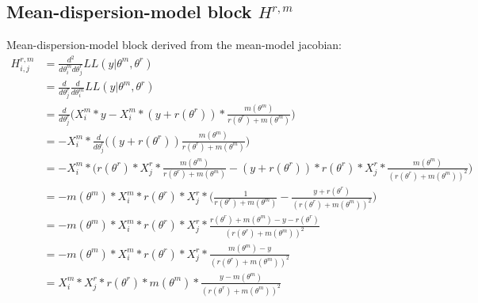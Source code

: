 \documentclass[bibliography=totoc,10pt]{scrartcl}
\begin{document}
\subsection{Mean-dispersion-model block $H^{r,m}$}
Mean-dispersion-model block derived from the mean-model jacobian:
\begin{equation}
\begin{split}
H^{r,m}_{i,j} &= \frac{d^2}{d \theta^m_i d \theta^r_j} LL(y|\theta^m, \theta^r) \\
&= \frac{d}{d \theta^r_j} \frac{d}{d \theta^m_i} LL(y|\theta^m, \theta^r) \\
&= \frac{d}{d \theta^r_j} \bigg( X^m_{i}*y - X^m_{i}*(y+r(\theta^r))*\frac{m(\theta^m)}{r(\theta^r)+m(\theta^m)} \bigg) \\
&= -X^m_{i}* \frac{d}{d \theta^r_j} \bigg(  (y+r(\theta^r)) \frac{m(\theta^m)}{r(\theta^r)+m(\theta^m)} \bigg) \\
&= -X^m_{i}* \bigg(  r(\theta^r) * X^r_{j} * \frac{m(\theta^m)}{r(\theta^r)+m(\theta^m)} - (y+r(\theta^r)) *  r(\theta^r) * X^r_{j}  * \frac{m(\theta^m)}{(r(\theta^r)+m(\theta^m))^2} \bigg) \\
&= - m(\theta^m) * X^m_{i}   * r(\theta^r) * X^r_{j}  * \bigg( \frac{1}{r(\theta^r)+m(\theta^m)} - \frac{y+r(\theta^r)}{(r(\theta^r)+m(\theta^m))^2} \bigg) \\
&= - m(\theta^m) * X^m_{i}   * r(\theta^r) * X^r_{j}  *  \frac{r(\theta^r)+m(\theta^m)-y-r(\theta^r)}{(r(\theta^r)+m(\theta^m))^2} \\
&= - m(\theta^m) * X^m_{i}   * r(\theta^r) * X^r_{j}  *  \frac{m(\theta^m)-y}{(r(\theta^r)+m(\theta^m))^2} \\
&= X^m_{i} * X^r_{j} * r(\theta^r) * m(\theta^m) *  \frac{y - m(\theta^m)}{(r(\theta^r)+m(\theta^m))^2} \\
\end{split}
\end{equation}
\end{document}
